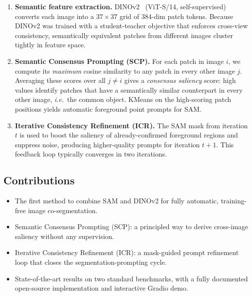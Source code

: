 \documentclass[10pt,twocolumn,letterpaper]{article}
\begin{document}
\begin{enumerate}
  \item \textbf{Semantic feature extraction.}
    DINOv2~\cite{oquab2023dinov2} (ViT-S/14, self-supervised) converts each
    image into a $37 \times 37$ grid of 384-dim patch tokens. Because DINOv2 was
    trained with a student-teacher objective that enforces cross-view consistency,
    semantically equivalent patches from different images cluster tightly in
    feature space.

  \item \textbf{Semantic Consensus Prompting (SCP).}
    For each patch in image $i$, we compute its \emph{maximum} cosine similarity
    to any patch in every other image $j$.
    Averaging these scores over all $j \neq i$ gives a \emph{consensus saliency}
    score: high values identify patches that have a semantically similar
    counterpart in every other image, \emph{i.e.}\ the common object.
    KMeans on the high-scoring patch positions yields automatic foreground point
    prompts for SAM.

  \item \textbf{Iterative Consistency Refinement (ICR).}
    The SAM mask from iteration $t$ is used to boost the saliency of
    already-confirmed foreground regions and suppress noise, producing
    higher-quality prompts for iteration $t+1$.
    This feedback loop typically converges in two iterations.
\end{enumerate}

\subsection{Contributions}
\begin{itemize}
  \item The first method to combine SAM and DINOv2 for fully automatic,
        training-free image co-segmentation.
  \item Semantic Consensus Prompting (SCP): a principled way to derive
        cross-image saliency without any supervision.
  \item Iterative Consistency Refinement (ICR): a mask-guided prompt refinement
        loop that closes the segmentation-prompting cycle.
  \item State-of-the-art results on two standard benchmarks, with a fully
        documented open-source implementation and interactive Gradio demo.
\end{itemize}

\end{document}
